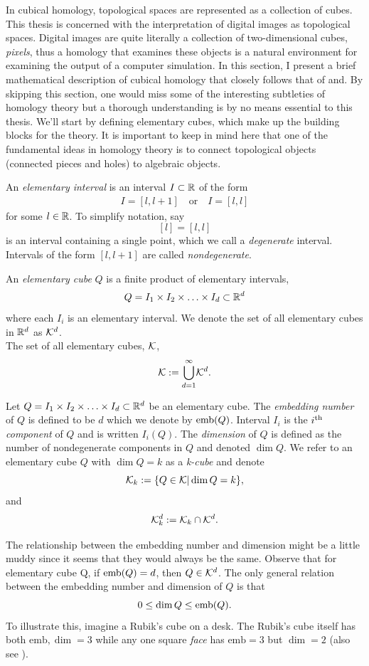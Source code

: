 In cubical homology, topological spaces are represented as a collection of cubes. This thesis is concerned with the interpretation of digital images as topological spaces. Digital images are quite literally a collection of two-dimensional cubes, \textit{pixels}, thus a homology that examines these objects is a natural environment for examining the output of a computer simulation. In this section, I present a brief mathematical description of cubical homology that closely follows that of and. By skipping this section, one would miss some of the interesting subtleties of homology theory but a thorough understanding is by no means essential to this thesis. We'll start by defining elementary cubes, which make up the building blocks for the theory. It is important to keep in mind here that one of the fundamental ideas in homology theory is to connect topological objects (\eg connected pieces and holes) to algebraic objects.

\begin{defn}
	An \textit{elementary interval} is an interval $I \subset \mathbb{R}$ of the form
	\begin{align*}
		I = [ l, l+1 ] \quad \text{or} \quad I = [l,l]
	\end{align*}
	for some $l \in \mathbb{R}$. To simplify notation, say $$[l] = [l, l]$$ is an interval containing a single point, which we call a \textit{degenerate} interval. Intervals of the form $[l, l+1]$ are called \textit{nondegenerate}.
\end{defn}

\begin{defn}
	An \textit{elementary cube} $Q$ is a finite product of elementary intervals, $$ Q = I_1 \times I_2 \times \ldots \times I_d \subset \mathbb{R}^d $$ where each $I_i$ is an elementary interval. We denote the set of all elementary cubes in $\mathbb{R}^d$ as $\mathcal{K}^{d}$. \\
	The set of all elementary cubes, $\mathcal{K}$,
	$$ \mathcal{K} := { \bigcup_{d=1}^{\infty} } \mathcal{K}^{d} . $$
\end{defn}

\begin{defn}
	Let $Q = I_1 \times I_2 \times \ldots \times I_d \subset \mathbb{R}^d$ be an elementary cube. The \textit{embedding number} of $Q$ is defined to be $d$ which we denote by $\mathord{\mathrm{emb}(Q)}$. Interval $I_i$ is the $i\textsuperscript{th}$ \textit{component} of $Q$ and is written $\mathord{I_i(Q)}$. The \textit{dimension} of $Q$ is defined as the number of nondegenerate components in $Q$ and denoted $\dim{Q}$. We refer to an elementary cube $Q$ with $\dim{Q} = k$ as a \textit{k-cube} and denote
	$$ \mathcal{K}_k := \{ Q \in \mathcal{K} | \dim{Q} = k \},$$ and
	$$ \mathcal{K}_{k}^{d} := \mathcal{K}_k \cap \mathcal{K}^{d}. $$
\end{defn}
The relationship between the embedding number and dimension might be a little muddy since it seems that they would always be the same. Observe that for elementary cube {Q}, if $\mathord{\mathrm{emb}(Q)} = d$, then $Q \in \mathcal{K}^{d}$. The only general relation between the embedding number and dimension of $Q$ is that $$ 0 \leq \dim{Q} \leq \mathord{\mathrm{emb}(Q)} .$$ To illustrate this, imagine a Rubik's cube on a desk. The Rubik's cube itself has both $\text{emb}, \dim = 3$ while any one square \textit{face} has $\text{emb} = 3$ but $\dim = 2$ (also see ).

